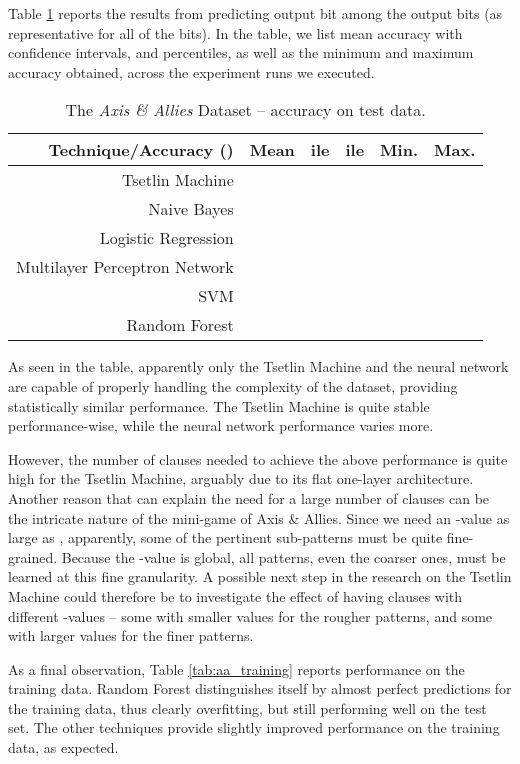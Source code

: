 \documentclass[11pt,a4paper]{article}
\begin{document}
Table \ref{tab:aa_test} reports the results from predicting output bit  among the  output bits (as representative for all of the bits). In the table, we list mean accuracy with  confidence intervals,  and  percentiles, as well as the minimum and maximum accuracy obtained, across the  experiment runs we executed. 
\begin{table}[!bh]
    \centering
    \begin{tabular}{r||c|c|c|c|c}
         \bf Technique/Accuracy ()&\bf Mean&\bf ile &\bf ile&\bf Min.&\bf Max.\\
         \hline
    Tsetlin Machine&&&&&\\
    Naive Bayes&&&&&\\
    Logistic Regression&&&&&\\
    Multilayer Perceptron Network&&&&&\\
    SVM&&&&&\\
    Random Forest&&&&&
    \end{tabular}
    \caption{The \emph{Axis \& Allies} Dataset -- accuracy on test data.}
    \label{tab:aa_test}
\end{table}
As seen in the table, apparently only the Tsetlin Machine and the neural network are capable of properly handling the complexity of the dataset, providing statistically similar performance. The Tsetlin Machine is quite stable performance-wise, while the neural network performance varies more.

However, the number of clauses needed to achieve the above performance is quite high for the Tsetlin Machine, arguably due to its flat one-layer architecture. Another reason that can explain the need for a large number of clauses can be the intricate nature of the mini-game of Axis \& Allies. Since we need an -value as large as , apparently, some of the pertinent sub-patterns must be quite fine-grained. Because the -value is global, all patterns, even the coarser ones, must be learned at this fine granularity. A possible next step in the research on the Tsetlin Machine could therefore be to investigate the effect of having clauses with different -values -- some with smaller values for the rougher patterns, and some with larger values for the finer patterns.

As a final observation, Table \ref{tab:aa_training} reports performance on the training data. Random Forest distinguishes itself by almost perfect predictions for the training data, thus clearly overfitting, but still performing well on the test set. The other techniques provide slightly improved performance on the training data, as expected.
\end{document}
